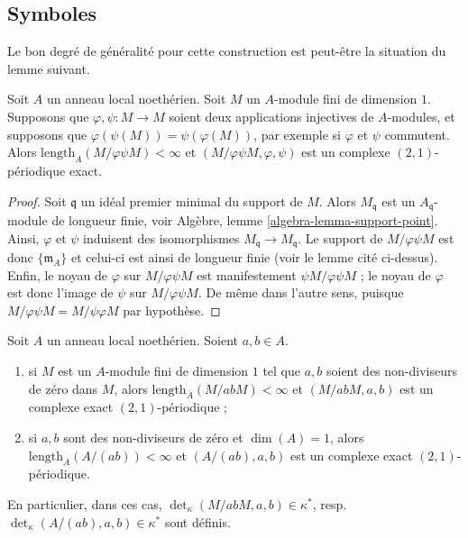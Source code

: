 







\subsection{Symboles}
\label{subsection-symbols}

\noindent
Le bon degré de généralité pour cette construction est peut-être la
situation du lemme suivant.

\begin{lemma}
\label{lemma-pre-symbol}
Soit $A$ un anneau local noethérien.
Soit $M$ un $A$-module fini de dimension $1$.
Supposons que $\varphi, \psi : M \to M$ soient deux applications injectives de
$A$-modules, et supposons que $\varphi(\psi(M)) = \psi(\varphi(M))$,
par exemple si $\varphi$ et $\psi$ commutent.
Alors $\text{length}_A(M/\varphi\psi M) < \infty$
et $(M/\varphi\psi M, \varphi, \psi)$ est un complexe
$(2, 1)$-périodique exact.
\end{lemma}

\begin{proof}
Soit $\mathfrak q$ un idéal premier minimal du support de $M$.
Alors $M_{\mathfrak q}$ est un $A_{\mathfrak q}$-module de longueur finie,
voir Algèbre, lemme \ref{algebra-lemma-support-point}.
Ainsi, $\varphi$ et $\psi$
induisent des isomorphismes $M_{\mathfrak q} \to M_{\mathfrak q}$.
Le support de $M/\varphi\psi M$ est donc $\{\mathfrak m_A\}$
et celui-ci est ainsi de longueur finie (voir le lemme cité ci-dessus).
Enfin, le noyau de $\varphi$ sur $M/\varphi\psi M$
est manifestement $\psi M/\varphi\psi M$ ; le noyau
de $\varphi$ est donc l'image de $\psi$ sur $M/\varphi\psi M$.
De même dans l'autre sens, puisque $M/\varphi\psi M = M/\psi\varphi M$
par hypothèse.
\end{proof}

\begin{lemma}
\label{lemma-symbol-defined}
Soit $A$ un anneau local noethérien. Soient $a, b \in A$.
\begin{enumerate}
\item si $M$ est un $A$-module fini de dimension $1$
tel que $a, b$ soient des non-diviseurs de zéro dans $M$, alors
$\text{length}_A(M/abM) < \infty$ et
$(M/abM, a, b)$ est un complexe exact $(2, 1)$-périodique ;
\item si $a, b$ sont des non-diviseurs de zéro et $\dim(A) = 1$,
alors $\text{length}_A(A/(ab)) < \infty$ et
$(A/(ab), a, b)$ est un complexe exact $(2, 1)$-périodique.
\end{enumerate}
En particulier, dans ces cas,
$\det_\kappa(M/abM, a, b) \in \kappa^*$,
resp.\ $\det_\kappa(A/(ab), a, b) \in \kappa^*$
sont définis.
\end{lemma}

